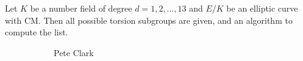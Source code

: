 \begin{frame}[plain,c]
	\begin{thm}
	Let $K$ be a number field of degree $d=1,2,\ldots,13$ and $E/K$ be an elliptic curve with CM. Then all possible torsion subgroups are given, and an algorithm to compute the list.
	\end{thm} 
	\begin{figure}[h]
	\centering
	\begin{subfigure}{0.23\textwidth}
	\captionsetup{labelformat=empty}
	\centering
	\caption{Pete Clark}
	\end{subfigure}
	\begin{subfigure}{0.23\textwidth}
	\captionsetup{labelformat=empty}
	\centering

\end{subfigure}
\end{figure}
\end{frame}
